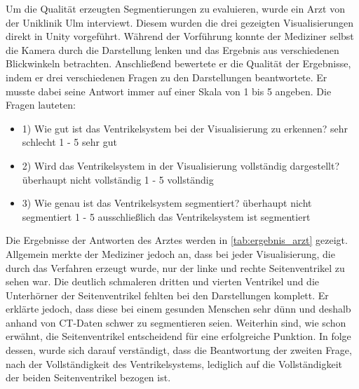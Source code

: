 Um die Qualität erzeugten Segmentierungen zu evaluieren, wurde ein Arzt von der Uniklinik Ulm interviewt. Diesem wurden die drei gezeigten Visualisierungen direkt in Unity vorgeführt. Während der Vorführung konnte der Mediziner selbst die Kamera durch die Darstellung lenken und das Ergebnis aus verschiedenen Blickwinkeln betrachten.
\newline
Anschließend bewertete er die Qualität der Ergebnisse, indem er drei verschiedenen Fragen zu den Darstellungen beantwortete. Er musste dabei seine Antwort immer auf einer Skala von 1 bis 5 angeben.
\newline
Die Fragen lauteten:
\begin{itemize}
	\item 1) Wie gut ist das Ventrikelsystem bei der Visualisierung zu erkennen? \newline sehr schlecht 1 - 5 sehr gut
	\item 2) Wird das Ventrikelsystem in der Visualisierung vollständig dargestellt? \newline überhaupt nicht vollständig 1 - 5 vollständig
	\item 3) Wie genau ist das Ventrikelsystem segmentiert? \newline überhaupt nicht segmentiert 1 - 5 ausschließlich das Ventrikelsystem ist segmentiert
\end{itemize}


Die Ergebnisse der Antworten des Arztes werden in \autoref{tab:ergebnis_arzt} gezeigt. Allgemein merkte der Mediziner jedoch an, dass bei jeder Visualisierung, die durch das Verfahren erzeugt wurde, nur der linke und rechte Seitenventrikel zu sehen war. Die deutlich schmaleren dritten und vierten Ventrikel und die Unterhörner der Seitenventrikel fehlten bei den Darstellungen komplett.
\newline
Er erklärte jedoch, dass diese bei einem gesunden Menschen sehr dünn und deshalb anhand von CT-Daten schwer zu segmentieren seien. Weiterhin sind, wie schon erwähnt, die Seitenventrikel entscheidend für eine erfolgreiche Punktion.
\newline
In folge dessen, wurde sich darauf verständigt, dass die Beantwortung der zweiten Frage, nach der Vollständigkeit des Ventrikelsystems, lediglich auf die Vollständigkeit der beiden Seitenventrikel bezogen ist.

\begin{table}[h]
\centering
\tiny
{}
\caption{Ergebnisse des Interviews mit einem Arzt}
\label{tab:ergebnis_arzt}
\end{table}


